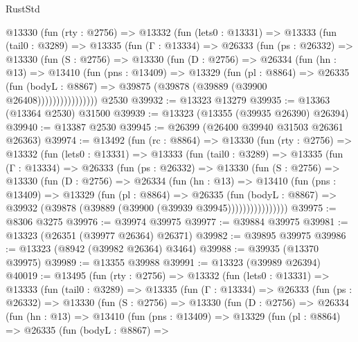 \begin{lexlean}{RustStd}
\begin{coremodule}
      @13330
        (fun (rty : @2756) =>
        @13332
          (fun (lets0 : @13331) =>
          @13333
            (fun (tail0 : @3289) =>
            @13335
              (fun (Γ : @13334) =>
              @26333
                (fun (ps : @26332) =>
                @13330
                  (fun (S : @2756) =>
                  @13330
                    (fun (D : @2756) =>
                    @26334
                      (fun (hn : @13) =>
                      @13410
                        (fun (pns : @13409) =>
                        @13329
                          (fun (pl : @8864) =>
                          @26335
                            (fun (bodyL : @8867) =>
                            @39875 (@39878 (@39889 (@39900 @26408))))))))))))))))
    @2530
@39932 := @13323 @13279
@39935 := @13363 (@13364 @2530) @31500
@39939 := @13323 (@13355 (@39935 @26390) @26394)
@39940 := @13387 @2530
@39945 := @26399 (@26400 @39940 @31503 @26361 @26363)
@39974 := @13492
    (fun (rc : @8864) =>
    @13330
      (fun (rty : @2756) =>
      @13332
        (fun (lets0 : @13331) =>
        @13333
          (fun (tail0 : @3289) =>
          @13335
            (fun (Γ : @13334) =>
            @26333
              (fun (ps : @26332) =>
              @13330
                (fun (S : @2756) =>
                @13330
                  (fun (D : @2756) =>
                  @26334
                    (fun (hn : @13) =>
                    @13410
                      (fun (pns : @13409) =>
                      @13329
                        (fun (pl : @8864) =>
                        @26335
                          (fun (bodyL : @8867) =>
                          @39932 (@39878 (@39889 (@39900 (@39939 @39945))))))))))))))))
@39975 := @8306 @3275
@39976 := @39974 @39975
@39977 := @39884 @39975
@39981 := @13323 (@26351 (@39977 @26364) @26371)
@39982 := @39895 @39975
@39986 := @13323 (@8942 (@39982 @26364) @3464)
@39988 := @39935 (@13370 @39975)
@39989 := @13355 @39988
@39991 := @13323 (@39989 @26394)
@40019 := @13495
    (fun (rty : @2756) =>
    @13332
      (fun (lets0 : @13331) =>
      @13333
        (fun (tail0 : @3289) =>
        @13335
          (fun (Γ : @13334) =>
          @26333
            (fun (ps : @26332) =>
            @13330
              (fun (S : @2756) =>
              @13330
                (fun (D : @2756) =>
                @26334
                  (fun (hn : @13) =>
                  @13410
                    (fun (pns : @13409) =>
                    @13329
                      (fun (pl : @8864) =>
                      @26335
                        (fun (bodyL : @8867) =>

\end{coremodule}
\end{lexlean}
